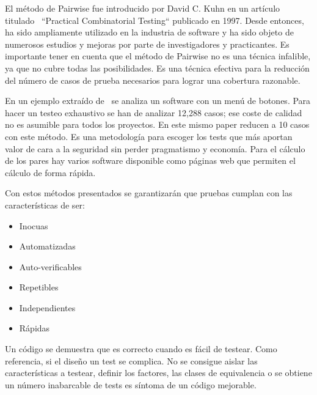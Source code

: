 El método de Pairwise fue introducido por David C. Kuhn en un artículo titulado~\cite{37051} “Practical Combinatorial Testing“ publicado en 1997.
Desde entonces, ha sido ampliamente utilizado en la industria de software y ha sido objeto de numerosos estudios y mejoras por parte de investigadores y practicantes.
Es importante tener en cuenta que el método de Pairwise no es una técnica infalible, ya que no cubre todas las posibilidades.
Es una técnica efectiva para la reducción del número de casos de prueba necesarios para lograr una cobertura razonable.

En un ejemplo extraído de~\cite{Bach04pairwisetesting} se analiza un software con un menú de botones.
Para hacer un testeo exhaustivo se han de analizar 12,288 casos;
ese coste de calidad no es asumible para todos los proyectos.
En este mismo paper reducen a 10 casos con este método.
Es una metodología para escoger los tests que más aportan valor de cara a la seguridad sin perder pragmatismo y economía.
Para el cálculo de los pares hay varios software disponible como páginas web que permiten el cálculo de forma rápida.

Con estos métodos presentados se garantizarán que pruebas cumplan con las características de ser:

\begin{itemize}
    \item Inocuas
    \item Automatizadas
    \item Auto-verificables
    \item Repetibles
    \item Independientes
    \item Rápidas
\end{itemize}

Un código se demuestra que es correcto cuando es fácil de testear.
Como referencia, si el diseño un test se complica.
No se consigue aislar las características a testear, definir los factores, las clases de equivalencia o se obtiene un número inabarcable de tests es síntoma de un código mejorable.